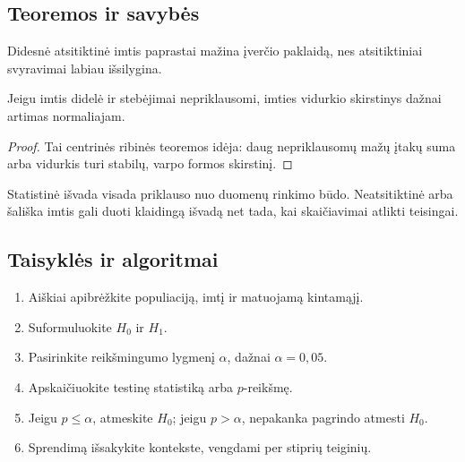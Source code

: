 \subsection{Teoremos ir savybės}
\begin{savybe}
Didesnė atsitiktinė imtis paprastai mažina įverčio paklaidą, nes atsitiktiniai svyravimai labiau išsilygina.
\end{savybe}
\begin{teorema}
Jeigu imtis didelė ir stebėjimai nepriklausomi, imties vidurkio skirstinys dažnai artimas normaliajam.
\end{teorema}
\begin{proof}
Tai centrinės ribinės teoremos idėja: daug nepriklausomų mažų įtakų suma arba vidurkis turi stabilų, varpo formos skirstinį.
\end{proof}
\begin{savybe}
Statistinė išvada visada priklauso nuo duomenų rinkimo būdo. Neatsitiktinė arba šališka imtis gali duoti klaidingą išvadą net tada, kai skaičiavimai atlikti teisingai.
\end{savybe}

\subsection{Taisyklės ir algoritmai}
\begin{enumerate}[label=\arabic*.]
\item Aiškiai apibrėžkite populiaciją, imtį ir matuojamą kintamąjį.
\item Suformuluokite \(H_0\) ir \(H_1\).
\item Pasirinkite reikšmingumo lygmenį \(\alpha\), dažnai \(\alpha=0{,}05\).
\item Apskaičiuokite testinę statistiką arba \(p\)-reikšmę.
\item Jeigu \(p\le\alpha\), atmeskite \(H_0\); jeigu \(p>\alpha\), nepakanka pagrindo atmesti \(H_0\).
\item Sprendimą išsakykite kontekste, vengdami per stiprių teiginių.
\end{enumerate}

